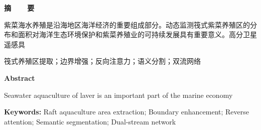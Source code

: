 
\newpage\pagestyle{empty}
\begin{center}{\bfseries\hei\fontsize{18pt}{18pt}\selectfont\setlength{\parskip}{0.5\baselineskip} {摘~~~~要}}\end{center} %

紫菜海水养殖是沿海地区海洋经济的重要组成部分。动态监测筏式紫菜养殖区的分布和面积对海洋生态环境保护和紫菜养殖业的可持续发展具有重要意义。高分卫星遥感具


{\bfseries\xiaosi{}}筏式养殖区提取；边界增强；反向注意力；语义分割；双流网络


\clearpage


\begin{center}{\bfseries\fontsize{18pt}{18pt}\selectfont\setlength{\parskip}{0.5\baselineskip} {Abstract}}\end{center}

Seawater aquaculture of laver is an important part of the marine economy 

{\bfseries {Keywords:}} Raft aquaculture area extraction; Boundary enhancement; Reverse attention; Semantic segmentation; Dual-stream network

\clearpage

